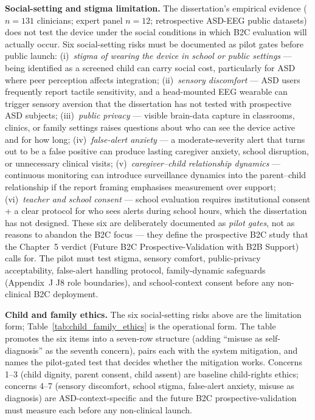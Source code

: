 \noindent\textbf{Social-setting and stigma limitation.} The dissertation's empirical evidence ($n = 131$ clinicians; expert panel $n = 12$; retrospective ASD-EEG public datasets) does not test the device under the social conditions in which B2C evaluation will actually occur. Six social-setting risks must be documented as pilot gates before public launch: (i)~\emph{stigma of wearing the device in school or public settings} --- being identified as a screened child can carry social cost, particularly for ASD where peer perception affects integration; (ii)~\emph{sensory discomfort} --- ASD users frequently report tactile sensitivity, and a head-mounted EEG wearable can trigger sensory aversion that the dissertation has not tested with prospective ASD subjects; (iii)~\emph{public privacy} --- visible brain-data capture in classrooms, clinics, or family settings raises questions about who can see the device active and for how long; (iv)~\emph{false-alert anxiety} --- a moderate-severity alert that turns out to be a false positive can produce lasting caregiver anxiety, school disruption, or unnecessary clinical visits; (v)~\emph{caregiver--child relationship dynamics} --- continuous monitoring can introduce surveillance dynamics into the parent--child relationship if the report framing emphasises measurement over support; (vi)~\emph{teacher and school consent} --- school evaluation requires institutional consent + a clear protocol for who sees alerts during school hours, which the dissertation has not designed. These six are deliberately documented as \emph{pilot gates}, not as reasons to abandon the B2C focus --- they define the prospective B2C study that the Chapter~5 verdict (Future B2C Prospective-Validation with B2B Support) calls for. The pilot must test stigma, sensory comfort, public-privacy acceptability, false-alert handling protocol, family-dynamic safeguards (Appendix~J J8 role boundaries), and school-context consent before any non-clinical B2C deployment.

\noindent\textbf{Child and family ethics.} The six social-setting risks above are the limitation form; Table~\ref{tab:child_family_ethics} is the operational form. The table promotes the six items into a seven-row structure (adding ``misuse as self-diagnosis'' as the seventh concern), pairs each with the system mitigation, and names the pilot-gated test that decides whether the mitigation works. Concerns 1--3 (child dignity, parent consent, child assent) are baseline child-rights ethics; concerns 4--7 (sensory discomfort, school stigma, false-alert anxiety, misuse as diagnosis) are ASD-context-specific and the future B2C prospective-validation must measure each before any non-clinical launch.


